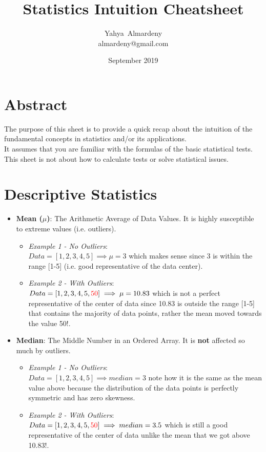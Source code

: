 \documentclass[11pt, twocolumn]{article}
\title{Statistics Intuition Cheatsheet}
\author{Yahya~Almardeny\\almardeny@gmail.com}
\date{September 2019}
\begin{document}
\begin{titlepage}
\maketitle
\end{titlepage}
\section{Abstract}
The purpose of this sheet is to provide a quick recap about the {\color{blue} intuition} of the fundamental concepts in statistics and/or its {\color{blue} applications}.\\
It assumes that you are familiar with the formulas of the basic statistical tests.\\
This sheet is {\color{red} not} about how to calculate tests or solve statistical issues.
\section{Descriptive Statistics}
\begin{itemize}
\item \textbf{Mean ($\mu$)}: The Arithmetic Average of Data Values. It is highly susceptible to extreme values (i.e. outliers).
\begin{itemize}
\item \textit{Example 1 - No Outliers}:\\ 
$Data = [1,2,3,4,5] \implies \mu = 3$  which makes sense since 3 is within the range [1-5] (i.e. good representative of the data center).
\item \textit{Example 2 - With Outliers}:\\
$Data = [1,2,3,4,5, {\color{red} 50}] \implies \mu = 10.83$  which is not a perfect representative of the center of data since 10.83 is outside the range [1-5] that contains the {\color{blue} majority} of data points, rather the mean moved towards the value 50!.
\end{itemize}
\end{itemize}

\begin{itemize}
\item \textbf{Median}: The Middle Number in an Ordered Array. It is \textbf{not} affected so much by outliers.
\begin{itemize}
\item \textit{Example 1 - No Outliers}:\\ 
$Data = [1,2,3,4,5] \implies median = 3$  note how it is the same as the mean value above because the distribution of the data points is {\color{blue} perfectly symmetric} and has {\color{blue} zero skewness}.
\item \textit{Example 2 - With Outliers}:\\
$Data = [1,2,3,4,5, {\color{red} 50}] \implies median = 3.5$  which is {\color{blue} still a good} representative of the center of data unlike the mean that we got above 10.83!.
\end{itemize}
\end{itemize}
\end{document}
